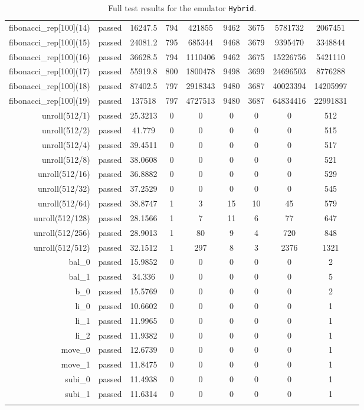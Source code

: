 \begin{longtable}{r|ccccccccc}
    fibonacci\_rep[100](14) & passed & 16247.5 & 794 & 421855 & 9462 & 3675 & 5781732 & 2067451 \\
    fibonacci\_rep[100](15) & passed & 24081.2 & 795 & 685344 & 9468 & 3679 & 9395470 & 3348844 \\
    fibonacci\_rep[100](16) & passed & 36628.5 & 794 & 1110406 & 9462 & 3675 & 15226756 & 5421110 \\
    fibonacci\_rep[100](17) & passed & 55919.8 & 800 & 1800478 & 9498 & 3699 & 24696503 & 8776288 \\
    fibonacci\_rep[100](18) & passed & 87402.5 & 797 & 2918343 & 9480 & 3687 & 40023394 & 14205997 \\
    fibonacci\_rep[100](19) & passed & 137518 & 797 & 4727513 & 9480 & 3687 & 64834416 & 22991831 \\
    unroll(512/1) & passed & 25.3213 & 0 & 0 & 0 & 0 & 0 & 512 \\
    unroll(512/2) & passed & 41.779 & 0 & 0 & 0 & 0 & 0 & 515 \\
    unroll(512/4) & passed & 39.4511 & 0 & 0 & 0 & 0 & 0 & 517 \\
    unroll(512/8) & passed & 38.0608 & 0 & 0 & 0 & 0 & 0 & 521 \\
    unroll(512/16) & passed & 36.8882 & 0 & 0 & 0 & 0 & 0 & 529 \\
    unroll(512/32) & passed & 37.2529 & 0 & 0 & 0 & 0 & 0 & 545 \\
    unroll(512/64) & passed & 38.8747 & 1 & 3 & 15 & 10 & 45 & 579 \\
    unroll(512/128) & passed & 28.1566 & 1 & 7 & 11 & 6 & 77 & 647 \\
    unroll(512/256) & passed & 28.9013 & 1 & 80 & 9 & 4 & 720 & 848 \\
    unroll(512/512) & passed & 32.1512 & 1 & 297 & 8 & 3 & 2376 & 1321 \\
    bal\_0 & passed & 15.9852 & 0 & 0 & 0 & 0 & 0 & 2 \\
    bal\_1 & passed & 34.336 & 0 & 0 & 0 & 0 & 0 & 5 \\
    b\_0 & passed & 15.5769 & 0 & 0 & 0 & 0 & 0 & 2 \\
    li\_0 & passed & 10.6602 & 0 & 0 & 0 & 0 & 0 & 1 \\
    li\_1 & passed & 11.9965 & 0 & 0 & 0 & 0 & 0 & 1 \\
    li\_2 & passed & 11.9382 & 0 & 0 & 0 & 0 & 0 & 1 \\
    move\_0 & passed & 12.6739 & 0 & 0 & 0 & 0 & 0 & 1 \\
    move\_1 & passed & 11.8475 & 0 & 0 & 0 & 0 & 0 & 1 \\
    subi\_0 & passed & 11.4938 & 0 & 0 & 0 & 0 & 0 & 1 \\
    subi\_1 & passed & 11.6314 & 0 & 0 & 0 & 0 & 0 & 1 \\

    \bottomrule
    \caption{Full test results for the emulator \texttt{Hybrid}.}
    \label{tbl:full-test-output-hybrid}
\end{longtable}


